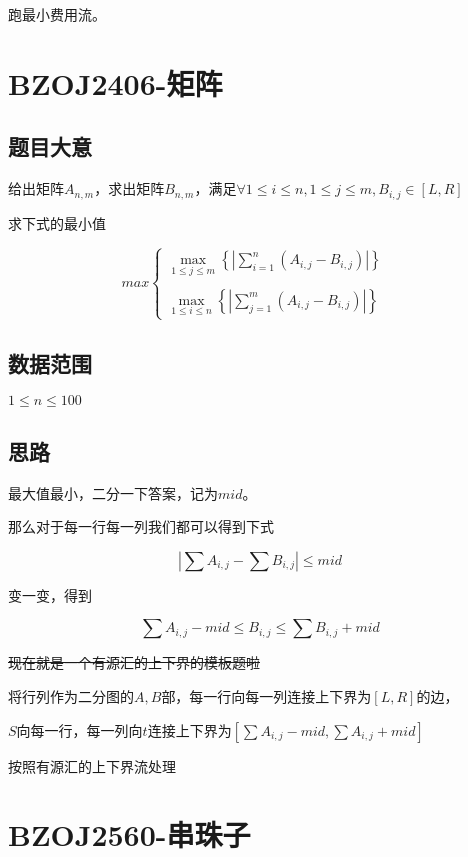 \documentclass{ctexart}
\numberwithin{equation}{section}
\begin{document}
\begin{flushleft}
  跑最小费用流。
  \newpage

  \section{BZOJ2406-矩阵}
  \subsection{题目大意}
  给出矩阵$A_{n,m}$，求出矩阵$B_{n,m}$，满足$\forall 1\le i\le n,1\le j\le m,B_{i,j}\in[L,R]$

  求下式的最小值

  \[max\left\{\begin{array}{ll}
  \max\limits_{1\le j \le m}\left\{|\sum\limits_{i=1}^n(A_{i,j}-B_{i,j})|\right\}&\\
  ~\\
  \max\limits_{1\le i\le n}\left\{|\sum\limits_{j=1}^m(A_{i,j}-B_{i,j})|\right\}&
  \end{array}\right.\]
  
    
  \subsection{数据范围}
  $1\le n \le 100$
  \subsection{思路}
  
  最大值最小，二分一下答案，记为$mid$。

  那么对于每一行每一列我们都可以得到下式

  $$| \sum A_{i,j}-\sum B_{i,j}| \le mid$$

  变一变，得到

  $$\sum A_{i,j}-mid\le B_{i,j}\le \sum B_{i,j}+mid$$

  \sout{现在就是一个有源汇的上下界的模板题啦}

  将行列作为二分图的$A,B$部，每一行向每一列连接上下界为$[L,R]$的边，

  $S$向每一行，每一列向$t$连接上下界为$[\sum A_{i,j}-mid,\sum A_{i,j}+mid]$

  按照有源汇的上下界流处理
  \newpage

  \section{BZOJ2560-串珠子}

\end{flushleft}
\end{document}
